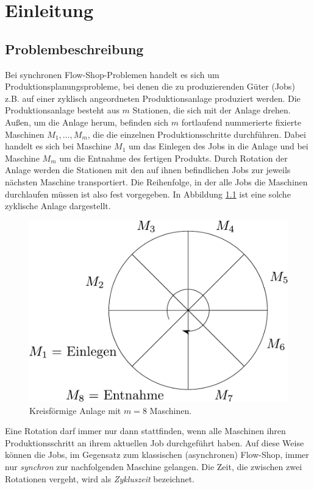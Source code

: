 \documentclass{scrreprt}
\begin{document}
\tableofcontents

\chapter{Einleitung}
\section{Problembeschreibung}
Bei synchronen Flow-Shop-Problemen handelt es sich um Produktions\-planungs\-probleme,
bei denen die zu produzierenden Güter (Jobs) z.B. auf einer zyklisch angeordneten Produktionsanlage
produziert werden. Die Produktionsanlage be\-steht aus $m$ Stationen, die sich mit der Anlage drehen.
Außen, um die Anlage herum, befinden sich $m$ fortlaufend nummerierte fixierte Maschinen $M_1,\ldots,M_m$, die die einzelnen Produktionsschritte durchführen.
Dabei handelt es sich bei Maschine $M_1$ um das Einlegen des Jobs in die Anlage und bei Maschine $M_m$ um die Entnahme des fertigen Produkts.
Durch Rotation der Anlage werden die Stationen mit den auf ihnen befindlichen Jobs zur jeweils nächsten Maschine transportiert.
Die Reihenfolge, in der alle Jobs die Maschinen durchlaufen müssen ist also fest vorgegeben.
In Abbildung \ref{abb:Anlage} ist eine solche zyklische Anlage dargestellt.
\begin{figure}
    \begin{center}
        \includegraphics[width=.6\textwidth]{graphics/anlage.pdf}
    \end{center}
    \caption{
        \label{abb:Anlage}
        Kreisförmige Anlage mit $m=8$ Maschinen.
    }
\end{figure}
Eine Rotation darf immer nur dann stattfinden, wenn alle Maschinen ihren Produktionsschritt an ihrem aktuellen Job
durchgeführt haben. Auf diese Weise können die Jobs, im Gegensatz zum klassischen (asynchronen) Flow-Shop, 
immer nur \textit{synchron} zur nachfolgenden Maschine gelangen.
Die Zeit, die zwischen zwei Rotationen vergeht, wird als \textit{Zykluszeit} bezeichnet.
\end{document}

